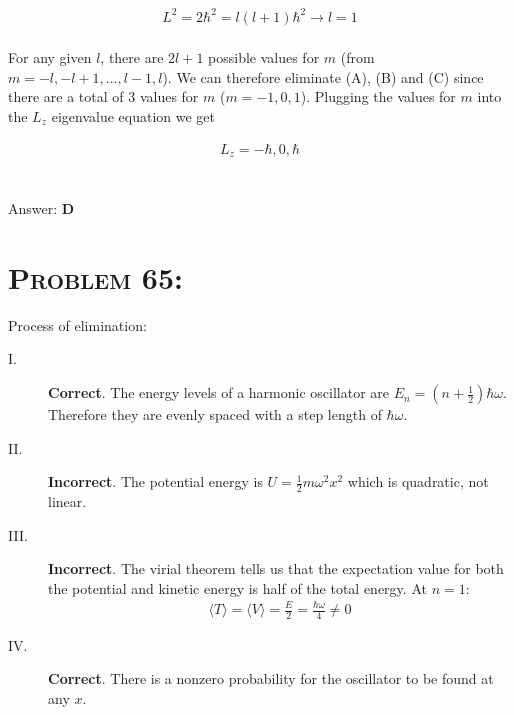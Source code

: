 \documentclass{article}
\begin{document}
\begin{align}
L^{2} = 2 \hbar^{2} = l (l +1) \hbar^{2} \rightarrow l = 1\nonumber
\end{align}
\\
For any given $l$, there are $2 l +1$ possible values for $m$ (from $m = - l, - l + 1, ... , l - 1, l$). We can therefore eliminate (A), (B) and (C) since there are a total of 3 values for $m$ ($m = -1, 0, 1$). Plugging the values for $m$ into the $L_{z}$ eigenvalue equation we get

\begin{align}
\boxed{L_{z} = -\hbar, 0, \hbar}\nonumber
\end{align}
\\\\
Answer: \textbf{\textcolor{ProcessBlue}D}\\


\section{\textsc{Problem 65:}} Process of elimination:

\begin{description}

\item[I.] \textbf{Correct}. The energy levels of a harmonic oscillator are $E_{n} = \left( n +\frac{1}{2}\right)\hbar \omega$. Therefore they are evenly spaced with a step length of $\hbar \omega$.

\item[II.] \textbf{Incorrect}. The potential energy is $U = \frac{1}{2} m \omega^{2} x^{2}$ which is quadratic, not linear.

\item[III.] \textbf{Incorrect}. The virial theorem tells us that the expectation value for both the potential and kinetic energy is half of the total energy. At $n =1$:\\
\begin{align}
\langle T \rangle = \langle V \rangle = \frac{E}{2} = \frac{\hbar \omega}{4} \neq 0\nonumber
\end{align}

\item[IV.] \textbf{Correct}. There is a nonzero probability for the oscillator to be found at any $x$.\\

\end{description}
\end{document}
